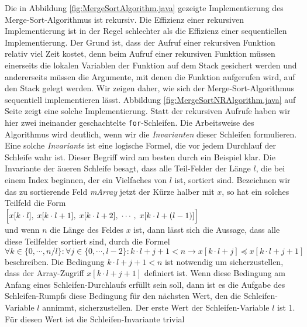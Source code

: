 \noindent
Die in Abbildung \ref{fig:MergeSortAlgorithm.java} gezeigte Implementierung des
Merge-Sort-Algorithmus ist rekursiv.  Die Effizienz einer rekursiven Implementierung ist
in der Regel schlechter als die Effizienz einer sequentiellen Implementierung.
Der Grund ist, dass der Aufruf einer rekursiven Funktion relativ viel Zeit kostet, denn
beim Aufruf einer rekursiven Funktion m\"ussen einerseits die lokalen Variablen der Funktion auf dem
Stack gesichert werden und andererseits m\"ussen die Argumente, mit denen die Funktion
aufgerufen wird, auf den Stack gelegt werden.  Wir zeigen daher, wie sich der
Merge-Sort-Algorithmus sequentiell implementieren l\"asst.  Abbildung
\ref{fig:MergeSortNRAlgorithm.java} auf Seite \pageref{fig:MergeSortNRAlgorithm.java}
zeigt eine solche Implementierung.
Statt der rekursiven Aufrufe haben wir hier zwei ineinander geschachtelte
\texttt{for}-Schleifen.  Die Arbeitsweise des Algorithmus wird deutlich, wenn wir die
\emph{Invarianten} dieser Schleifen formulieren.  Eine solche \emph{Invariante} ist eine
logische Formel, die vor jedem Durchlauf der Schleife wahr ist.  Dieser Begriff
wird am besten durch ein Beispiel klar.  Die Invariante der \"au\3eren Schleife besagt,
dass alle Teil-Felder der L\"ange $l$, die bei einem Index beginnen, der ein Vielfaches von
$l$ ist, sortiert sind.  Bezeichnen wir das zu sortierende Feld \textsl{mArray} jetzt der
K\"urze halber mit $x$, so hat ein solches Teilfeld die Form 
\\[0.2cm]
\hspace*{1.3cm}
$\Bigl[x[k\cdot l],\; x[k\cdot l+1],\; x[k\cdot l+2],\; \cdots,\; x[k\cdot l+(l-1)]\Bigr]$
\\[0.2cm]
und wenn $n$ die L\"ange des Feldes $x$ ist, dann l\"asst sich die Aussage, dass alle
diese Teilfelder sortiert sind, durch die Formel 
\\[0.2cm]
\hspace*{0.8cm}
$\forall k \in \{0, \cdots, n/l\}: \forall j\in\{0,\cdots,l-2\}: k\cdot l+j+1 < n \rightarrow x[k\cdot l+j] \preceq x[k\cdot l+j+1]$
\\[0.2cm]
beschreiben. Die Bedingung $k\cdot l+j+1 < n$  ist notwendig um sicherzustellen, dass der
Array-Zugriff $x[k\cdot l+j+1]$ definiert ist.  Wenn diese Bedingung am Anfang eines Schleifen-Durchlaufs
erf\"ullt sein soll, dann ist es die Aufgabe des Schleifen-Rumpfs diese Bedingung f\"ur den
n\"achsten Wert, den die Schleifen-Variable $l$ annimmt, sicherzustellen.  Der erste Wert
der Schleifen-Variable $l$ ist 1.   F\"ur diesen Wert ist die Schleifen-Invariante trivial
